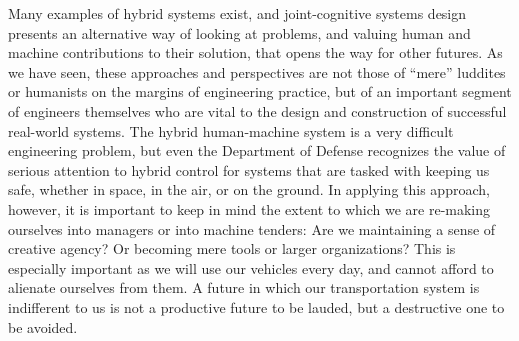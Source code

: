 Many examples of hybrid systems exist, and joint-cognitive systems
design presents an alternative way of looking at problems, and valuing
human and machine contributions to their solution, that opens the way
for other futures. As we have seen, these approaches and
perspectives are not those of ``mere'' luddites or humanists on the
margins of engineering practice, but of an important segment of
engineers themselves who are vital to the design and construction of
successful real-world systems. The hybrid human-machine system is a
very difficult engineering problem, but even the Department of Defense
recognizes the value of serious attention to hybrid control for 
systems that are tasked with keeping us safe, whether in space, in the
air, or on the ground. In applying this approach, however, it is
important to keep in mind the extent to which we are re-making
ourselves into managers or into machine tenders:  Are we maintaining a sense of
creative agency? Or becoming mere tools or larger organizations? This
is especially important as we will use our  
vehicles every day, and cannot afford to alienate ourselves from them.
A future in which our transportation system is indifferent to us is
not a productive future to be lauded, but a destructive one to be
avoided. 


